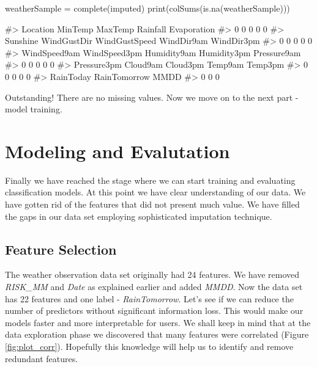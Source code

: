 \begin{Schunk}
\begin{Sinput}
weatherSample = complete(imputed)
print(colSums(is.na(weatherSample)))
\end{Sinput}
\begin{Soutput}
#>      Location       MinTemp       MaxTemp      Rainfall   Evaporation 
#>             0             0             0             0             0 
#>      Sunshine   WindGustDir WindGustSpeed    WindDir9am    WindDir3pm 
#>             0             0             0             0             0 
#>  WindSpeed9am  WindSpeed3pm   Humidity9am   Humidity3pm   Pressure9am 
#>             0             0             0             0             0 
#>   Pressure3pm      Cloud9am      Cloud3pm       Temp9am       Temp3pm 
#>             0             0             0             0             0 
#>     RainToday  RainTomorrow          MMDD 
#>             0             0             0
\end{Soutput}
\end{Schunk}

Outstanding! There are no missing values. Now we move on to the next
part - model training.

\hypertarget{modeling-and-evalutation}{%
\section{Modeling and Evalutation}\label{modeling-and-evalutation}}

Finally we have reached the stage where we can start training and
evaluating classification models. At this point we have clear
understanding of our data. We have gotten rid of the features that did
not present much value. We have filled the gaps in our data set
employing sophisticated imputation technique.

\hypertarget{feature-selection}{%
\subsection{Feature Selection}\label{feature-selection}}

The weather observation data set originally had 24 features. We have
removed \emph{RISK\_MM} and \emph{Date} as explained earlier and added
\emph{MMDD}. Now the data set has 22 features and one label -
\emph{RainTomorrow}. Let's see if we can reduce the number of predictors
without significant information loss. This would make our models faster
and more interpretable for users. We shall keep in mind that at the data
exploration phase we discovered that many features were correlated
(Figure \ref{fig:plot_corr}). Hopefully this knowledge will help us to
identify and remove redundant features.

